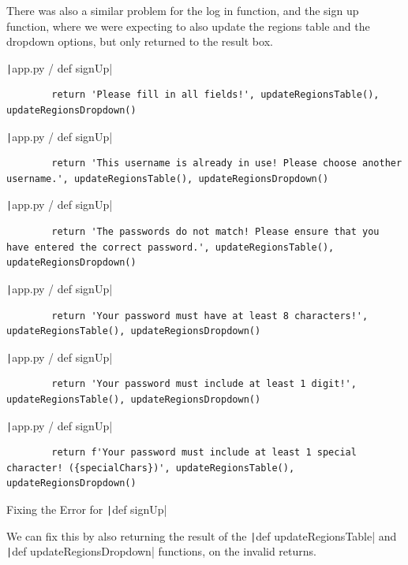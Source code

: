 \documentclass[12pt]{report}
\newcommand{\pil}[1]{\protect\texttt|#1|}
\begin{document}
There was also a similar problem for the log in function, and the sign up function, where we were expecting to also update the regions table and the dropdown options, but only returned to the result box.

\begin{listing}[H]
\pil{app.py / def signUp}
\begin{verbatim}
        return 'Please fill in all fields!', updateRegionsTable(), updateRegionsDropdown()
\end{verbatim}
\pil{app.py / def signUp}
\begin{verbatim}
        return 'This username is already in use! Please choose another username.', updateRegionsTable(), updateRegionsDropdown()
\end{verbatim}
\pil{app.py / def signUp}
\begin{verbatim}
        return 'The passwords do not match! Please ensure that you have entered the correct password.', updateRegionsTable(), updateRegionsDropdown()
\end{verbatim}
\pil{app.py / def signUp}
\begin{verbatim}
        return 'Your password must have at least 8 characters!', updateRegionsTable(), updateRegionsDropdown()
\end{verbatim}
\pil{app.py / def signUp}
\begin{verbatim}
        return 'Your password must include at least 1 digit!', updateRegionsTable(), updateRegionsDropdown()
\end{verbatim}
\pil{app.py / def signUp}
\begin{verbatim}
        return f'Your password must include at least 1 special character! ({specialChars})', updateRegionsTable(), updateRegionsDropdown()
\end{verbatim}
\caption{Fixing the Error for \pil{def signUp}}\label{cs:fixForSignUp}
\end{listing}

We can fix this by also returning the result of the \pil{def updateRegionsTable} and \pil{def updateRegionsDropdown} functions, on the invalid returns.
\end{document}
